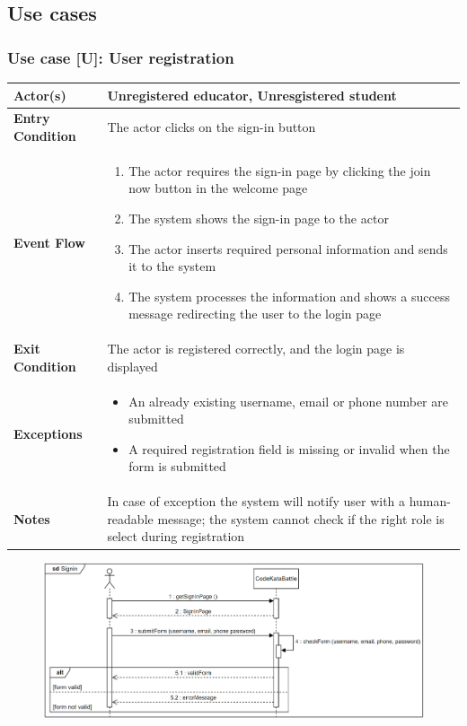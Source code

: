 \documentclass[12pt, a4paper]{report}
\newcounter{useCase}
\newcommand{\usecase}[9]{
    \def\arraystretch{1.5} 
    \subsubsection*{Use case [U#2]: #3}
    \vspace*{0.2cm}
    \begin{center}
        \begin{tabular}{|l|p{12cm}|}
            \hline
            \textbf{Actor(s)} & #4 \\
            \hline
            \textbf{Entry Condition} & #5 \\
            \hline
            \textbf{Event Flow} & #6 \\
            \hline
            \textbf{Exit Condition} & #7 \\
            \hline
            \textbf{Exceptions} & #8 \\
            \hline
            \textbf{Notes} & #9 \\
            \hline
        \end{tabular}
    \end{center}
    #1
}
\begin{document}
        \subsection{Use cases}
        \usecase 
        {\begin{figure}[H]\centering\includegraphics[width=0.9\linewidth]{images/signup.png}\end{figure}}        
        {\arabic{useCase}\stepcounter{useCase}}
        {User registration}
        {Unregistered educator, Unresgistered student}
        {The actor clicks on the sign-in button}
        {
        \begin{enumerate}
            \item The actor requires the sign-in page by clicking the join now button in the welcome page
            \item The system shows the sign-in page to the actor
            \item The actor inserts required personal information and sends it to the system
            \item The system processes the information and shows a success message redirecting the user to the login page
        \end{enumerate}
        }
        {The actor is registered correctly, and the login page is displayed}
        {
        \begin{itemize}
            \item An already existing username, email or phone number are submitted
            \item A required registration field is missing or invalid when the form is submitted
        \end{itemize}
        }
        {In case of exception the system will notify user with a human-readable message; the system cannot check if the right role is select during registration}
\end{document}
